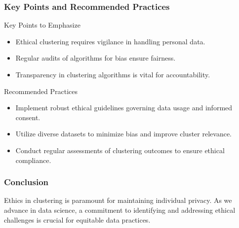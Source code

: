 \documentclass[aspectratio=169]{beamer}
\begin{document}
\begin{frame}[fragile]
    \frametitle{Key Points and Recommended Practices}
    \begin{block}{Key Points to Emphasize}
        \begin{itemize}
            \item Ethical clustering requires vigilance in handling personal data.
            \item Regular audits of algorithms for bias ensure fairness.
            \item Transparency in clustering algorithms is vital for accountability.
        \end{itemize}
    \end{block}
    
    \begin{block}{Recommended Practices}
        \begin{itemize}
            \item Implement robust ethical guidelines governing data usage and informed consent.
            \item Utilize diverse datasets to minimize bias and improve cluster relevance.
            \item Conduct regular assessments of clustering outcomes to ensure ethical compliance.
        \end{itemize}
    \end{block}
\end{frame}

\begin{frame}[fragile]
    \frametitle{Conclusion}
    Ethics in clustering is paramount for maintaining individual privacy. As we advance in data science, a commitment to identifying and addressing ethical challenges is crucial for equitable data practices.
\end{frame}
\end{document}
